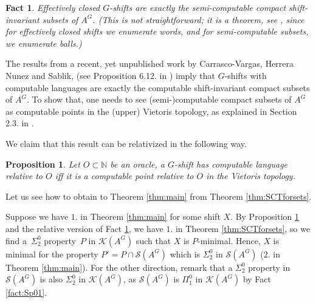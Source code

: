 \documentclass[french,american]{article}
\theoremstyle{plain}
\newtheorem{proposition}[theorem]{Proposition}
\theoremstyle{definition}
\theoremstyle{remark}
\theoremstyle{plain}
\newtheorem{fact}[theorem]{Fact}
\begin{document}
\begin{fact}
\label{fact:Effective-semicomputable}Effectively closed $G$-shifts are exactly
the semi-computable compact shift-invariant subsets of $A^{G}$. (This is not straightforward; it is a theorem, see \cite{AUBRUN201735}, since
for effectively closed shifts we enumerate words, and for semi-computable subsets,
we enumerate balls.)
\end{fact}

The results from a recent, yet unpublished work by Carrasco-Vargas,
Herrera Nunez and Sablik, (see Proposition 6.12. in \cite{Phdnicanor2024})
imply that $G$-shifts with computable languages are exactly the computable
shift-invariant compact subsets of $A^{G}$. To show that, one needs to see
(semi-)computable compact subsets of $A^{G}$ as computable points in the
(upper) Vietoris topology, as explained in Section 2.3. in \cite{Phdamir2024}.

We claim that this result can be relativized in the following way.
\begin{proposition}
\label{prop:decidable-computable}Let $O\subset\mathbb{N}$ be an
oracle, a $G$-shift has computable language relative to $O$ iff
it is a computable point relative to $O$ in the Vietoris topology.
\end{proposition}

Let us see how to obtain to Theorem \ref{thm:main} from Theorem \ref{thm:SCTforsets}.

Suppose we have $1.$ in Theorem \ref{thm:main} for some shift $X$. By Proposition \ref{prop:decidable-computable} and the relative version of Fact \ref{fact:Effective-semicomputable}, we have $1.$ in Theorem \ref{thm:SCTforsets}, so we find a~$\Sigma_{2}^{0}$ property~$P$ in $\mathcal{K}(A^{G})$
such that $X$ is $P$-minimal. Hence, $X$ is minimal for the property $P'=P \cap \mathcal{S}(A^{G})$ which is $\Sigma_{2}^{0}$ in $\mathcal{S}(A^{G})$ ($2.$ in Theorem \ref{thm:main}).
For the other direction, remark that a $\Sigma_{2}^{0}$ property in $\mathcal{S}(A^{G})$ is also $\Sigma_{2}^{0}$ in $\mathcal{K}(A^{G})$, as $\mathcal{S}(A^{G})$ is $\Pi_1^0$ in $\mathcal{K}(A^{G})$ by Fact \ref{fact:Sp01}.
\end{document}
